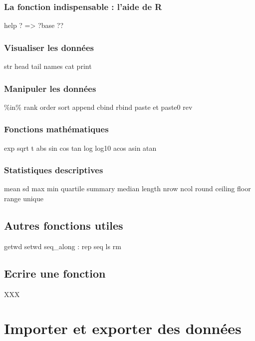 \documentclass[]{book}
\begin{document}
\subsection{La fonction indispensable : l'aide de
R}\label{la-fonction-indispensable-laide-de-r}

help ? =\textgreater{} ?base ??

\subsection{Visualiser les données}\label{visualiser-les-donnees}

str head tail names cat print

\subsection{Manipuler les données}\label{manipuler-les-donnees}

\%in\% rank order sort append cbind rbind paste et paste0 rev

\subsection{Fonctions mathématiques}\label{fonctions-mathematiques}

exp sqrt t abs sin cos tan log log10 acos asin atan

\subsection{Statistiques descriptives}\label{statistiques-descriptives}

mean sd max min quartile summary median length nrow ncol round ceiling
floor range unique

\section{Autres fonctions utiles}\label{autres-fonctions-utiles}

getwd setwd seq\_along : rep seq ls rm

\section{Ecrire une fonction}\label{ecrire-une-fonction}

XXX

\chapter{Importer et exporter des données}\label{import}
\end{document}
